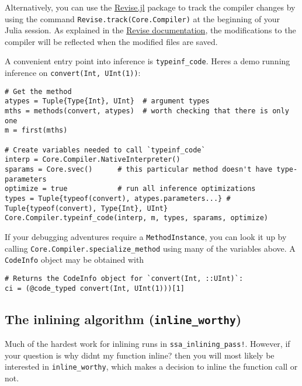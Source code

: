 Alternatively, you can use the \href{https://github.com/timholy/Revise.jl}{Revise.jl} package to track the compiler changes by using the command \texttt{Revise.track(Core.Compiler)} at the beginning of your Julia session. As explained in the \href{https://timholy.github.io/Revise.jl/stable/}{Revise documentation}, the modifications to the compiler will be reflected when the modified files are saved.



A convenient entry point into inference is \texttt{typeinf\_code}. Here{\textquotesingle}s a demo running inference on \texttt{convert(Int, UInt(1))}:




\begin{verbatim}
# Get the method
atypes = Tuple{Type{Int}, UInt}  # argument types
mths = methods(convert, atypes)  # worth checking that there is only one
m = first(mths)

# Create variables needed to call `typeinf_code`
interp = Core.Compiler.NativeInterpreter()
sparams = Core.svec()      # this particular method doesn't have type-parameters
optimize = true            # run all inference optimizations
types = Tuple{typeof(convert), atypes.parameters...} # Tuple{typeof(convert), Type{Int}, UInt}
Core.Compiler.typeinf_code(interp, m, types, sparams, optimize)
\end{verbatim}



If your debugging adventures require a \texttt{MethodInstance}, you can look it up by calling \texttt{Core.Compiler.specialize\_method} using many of the variables above. A \texttt{CodeInfo} object may be obtained with




\begin{verbatim}
# Returns the CodeInfo object for `convert(Int, ::UInt)`:
ci = (@code_typed convert(Int, UInt(1)))[1]
\end{verbatim}



\hypertarget{3650644351684738912}{}


\subsection{The inlining algorithm (\texttt{inline\_worthy})}



Much of the hardest work for inlining runs in \texttt{ssa\_inlining\_pass!}. However, if your question is {\textquotedbl}why didn{\textquotesingle}t my function inline?{\textquotedbl} then you will most likely be interested in \texttt{inline\_worthy}, which makes a decision to inline the function call or not.



